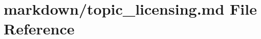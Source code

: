 \hypertarget{topic__licensing_8md}{}\section{markdown/topic\+\_\+licensing.md File Reference}
\label{topic__licensing_8md}
